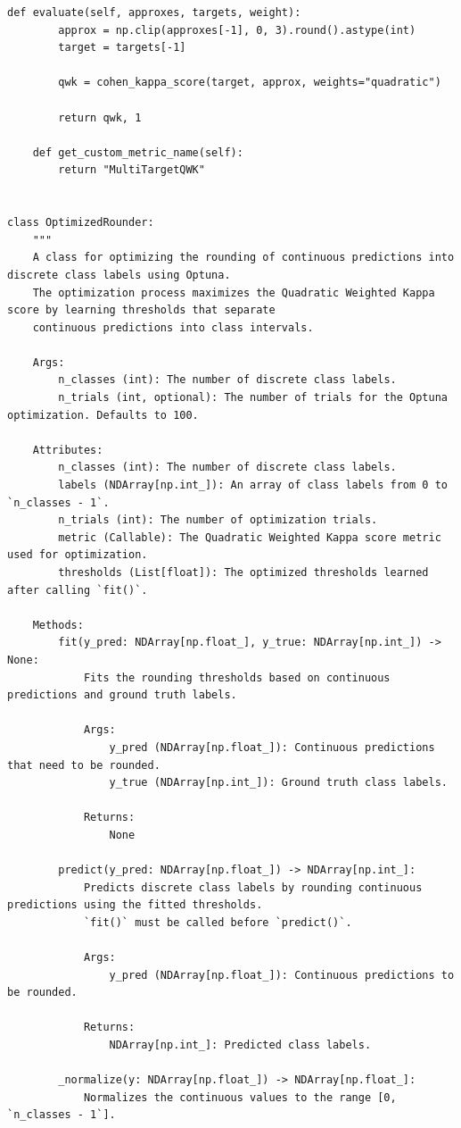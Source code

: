 \documentclass[11pt]{extarticle}
\begin{document}
\begin{mdframed}
\begin{lstlisting}[breaklines=true]
    def evaluate(self, approxes, targets, weight):
        approx = np.clip(approxes[-1], 0, 3).round().astype(int)
        target = targets[-1]

        qwk = cohen_kappa_score(target, approx, weights="quadratic")

        return qwk, 1

    def get_custom_metric_name(self):
        return "MultiTargetQWK"


class OptimizedRounder:
    """
    A class for optimizing the rounding of continuous predictions into discrete class labels using Optuna.
    The optimization process maximizes the Quadratic Weighted Kappa score by learning thresholds that separate
    continuous predictions into class intervals.

    Args:
        n_classes (int): The number of discrete class labels.
        n_trials (int, optional): The number of trials for the Optuna optimization. Defaults to 100.

    Attributes:
        n_classes (int): The number of discrete class labels.
        labels (NDArray[np.int_]): An array of class labels from 0 to `n_classes - 1`.
        n_trials (int): The number of optimization trials.
        metric (Callable): The Quadratic Weighted Kappa score metric used for optimization.
        thresholds (List[float]): The optimized thresholds learned after calling `fit()`.

    Methods:
        fit(y_pred: NDArray[np.float_], y_true: NDArray[np.int_]) -> None:
            Fits the rounding thresholds based on continuous predictions and ground truth labels.

            Args:
                y_pred (NDArray[np.float_]): Continuous predictions that need to be rounded.
                y_true (NDArray[np.int_]): Ground truth class labels.

            Returns:
                None

        predict(y_pred: NDArray[np.float_]) -> NDArray[np.int_]:
            Predicts discrete class labels by rounding continuous predictions using the fitted thresholds.
            `fit()` must be called before `predict()`.

            Args:
                y_pred (NDArray[np.float_]): Continuous predictions to be rounded.

            Returns:
                NDArray[np.int_]: Predicted class labels.

        _normalize(y: NDArray[np.float_]) -> NDArray[np.float_]:
            Normalizes the continuous values to the range [0, `n_classes - 1`].


\end{lstlisting}
\end{mdframed}
\end{document}
